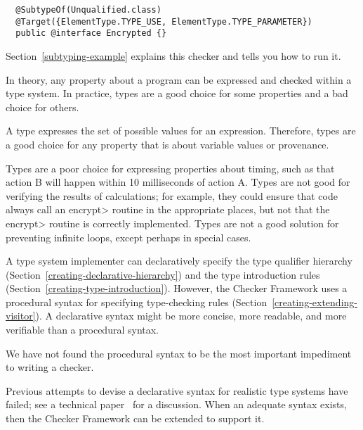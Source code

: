 \begin{Verbatim}
  @SubtypeOf(Unqualified.class)
  @Target({ElementType.TYPE_USE, ElementType.TYPE_PARAMETER})
  public @interface Encrypted {}
\end{Verbatim}

Section~\ref{subtyping-example} explains this checker and tells
you how to run it.



In theory, any property about a program can be expressed and checked within
a type system.  In practice, types are a good choice for some properties
and a bad choice for others.

A type expresses the set of possible values for an expression.  Therefore,
types are a good choice for any property that is about variable values or
provenance.

Types are a poor choice for expressing properties about timing, such as
that action B will happen within 10 milliseconds of action A.  Types are
not good for verifying the results of calculations; for example, they could
ensure that code always call an \<encrypt> routine in the appropriate
places, but not that the \<encrypt> routine is correctly implemented.
Types are not a good solution for preventing infinite loops, except perhaps
in special cases.



A type system implementer can declaratively specify the type qualifier
hierarchy (Section~\ref{creating-declarative-hierarchy}) and the type introduction rules
(Section~\ref{creating-type-introduction}).  However, the Checker
Framework uses a procedural syntax for specifying type-checking
rules (Section~\ref{creating-extending-visitor}).
A declarative syntax might be more concise, more readable, and more
verifiable than a procedural syntax.

We have not found the procedural syntax to be the most important impediment
to writing a checker.

Previous attempts to devise a declarative syntax
for realistic type systems have failed; see a technical
paper~\cite{PapiACPE2008} for a discussion.  When an
adequate syntax exists, then the Checker Framework can be extended to
support it.




